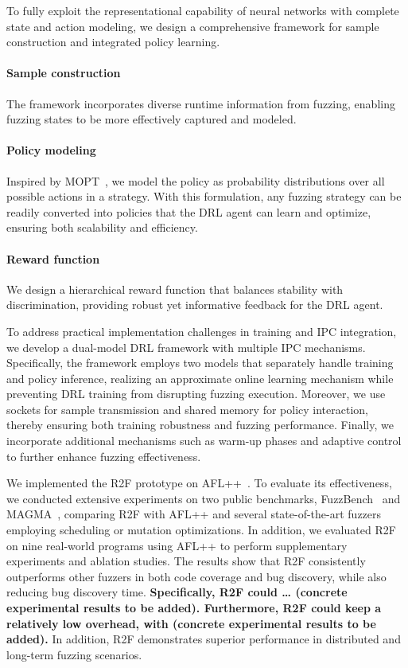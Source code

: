 \documentclass[lettersize,journal]{IEEEtran}
\begin{document}
To fully exploit the representational capability of neural networks with complete state and action modeling, we design a comprehensive framework for sample construction and integrated policy learning. 
\paragraph{Sample construction} The framework incorporates diverse runtime information from fuzzing, enabling fuzzing states to be more effectively captured and modeled. 
\paragraph{Policy modeling} Inspired by MOPT~\cite{lyuMOPTOptimizedMutation2019}, we model the policy as probability distributions over all possible actions in a strategy. With this formulation, any fuzzing strategy can be readily converted into policies that the DRL agent can learn and optimize, ensuring both scalability and efficiency. 
\paragraph{Reward function} We design a hierarchical reward function that balances stability with discrimination, providing robust yet informative feedback for the DRL agent.


To address practical implementation challenges in training and IPC integration, we develop a dual-model DRL framework with multiple IPC mechanisms. Specifically, the framework employs two models that separately handle training and policy inference, realizing an approximate online learning mechanism while preventing DRL training from disrupting fuzzing execution. Moreover, we use sockets for sample transmission and shared memory for policy interaction, thereby ensuring both training robustness and fuzzing performance. Finally, we incorporate additional mechanisms such as warm-up phases and adaptive control to further enhance fuzzing effectiveness.

We implemented the R2F prototype on AFL++~\cite{fioraldiAFLCombiningIncremental2020}. To evaluate its effectiveness, we conducted extensive experiments on two public benchmarks, FuzzBench~\cite{metzmanFuzzBenchOpenFuzzer2021} and MAGMA~\cite{hazimehMagmaGroundtruthFuzzing2021}, comparing R2F with AFL++ and several state-of-the-art fuzzers employing scheduling or mutation optimizations. In addition, we evaluated R2F on nine real-world programs using AFL++ to perform supplementary experiments and ablation studies. The results show that R2F consistently outperforms other fuzzers in both code coverage and bug discovery, while also reducing bug discovery time. \textbf{Specifically, R2F could … (concrete experimental results to be added). Furthermore, R2F could keep a relatively low overhead, with (concrete experimental results to be added).} In addition, R2F demonstrates superior performance in distributed and long-term fuzzing scenarios.
\end{document}
